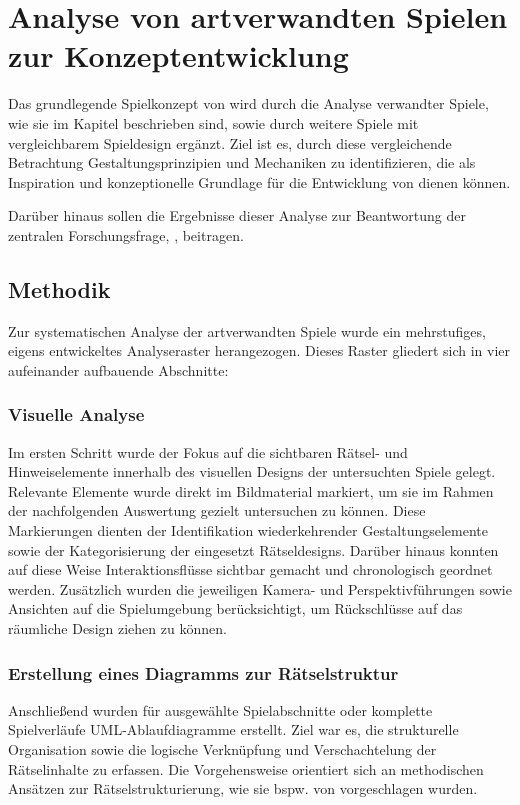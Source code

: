 \chapter{Analyse von artverwandten Spielen zur Konzeptentwicklung}\label{sec:analysis}

Das grundlegende Spielkonzept von  wird durch die Analyse verwandter Spiele, wie sie im Kapitel \emph{} beschrieben sind, sowie durch weitere Spiele mit vergleichbarem Spieldesign ergänzt. Ziel ist es, durch diese vergleichende Betrachtung Gestaltungsprinzipien und Mechaniken zu identifizieren, die als Inspiration und konzeptionelle Grundlage für die Entwicklung von  dienen können.

Darüber hinaus sollen die Ergebnisse dieser Analyse zur Beantwortung der zentralen Forschungsfrage, \emph{}, beitragen.

\section{Methodik}
Zur systematischen Analyse der artverwandten Spiele wurde ein mehrstufiges, eigens entwickeltes Analyseraster herangezogen. Dieses Raster gliedert sich in vier aufeinander aufbauende Abschnitte:

\subsection{Visuelle Analyse}
Im ersten Schritt wurde der Fokus auf die sichtbaren Rätsel- und Hinweiselemente innerhalb des visuellen Designs der untersuchten Spiele gelegt. Relevante Elemente wurde direkt im Bildmaterial markiert, um sie im Rahmen der nachfolgenden Auswertung gezielt untersuchen zu können. Diese Markierungen dienten der Identifikation wiederkehrender Gestaltungselemente sowie der Kategorisierung der eingesetzt Rätseldesigns. Darüber hinaus konnten auf diese Weise Interaktionsflüsse sichtbar gemacht und chronologisch geordnet werden. Zusätzlich wurden die jeweiligen Kamera- und Perspektivführungen sowie Ansichten auf die Spielumgebung berücksichtigt, um Rückschlüsse auf das räumliche Design ziehen zu können.

\subsection{Erstellung eines Diagramms zur Rätselstruktur}
Anschließend wurden für ausgewählte Spielabschnitte oder komplette Spielverläufe UML-Ablaufdiagramme erstellt. Ziel war es, die strukturelle Organisation sowie die logische Verknüpfung und Verschachtelung der Rätselinhalte zu erfassen. Die Vorgehensweise orientiert sich an methodischen Ansätzen zur Rätselstrukturierung, wie sie bspw. von \cite{tim_schafer_grim_1996} vorgeschlagen wurden.

